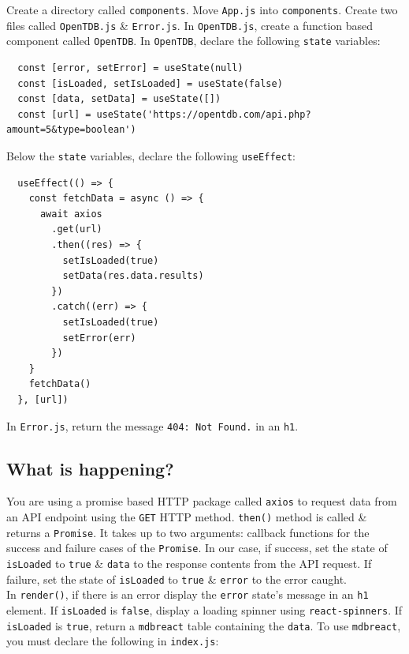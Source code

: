 \documentclass{article}
\begin{document}
Create a directory called \texttt{components}. Move \texttt{App.js} into \texttt{components}. Create two files called \texttt{OpenTDB.js} \& \texttt{Error.js}. In \texttt{OpenTDB.js}, create a function based component called \texttt{OpenTDB}. In \texttt{OpenTDB}, declare the following \texttt{state} variables:
\begin{verbatim}
  const [error, setError] = useState(null)
  const [isLoaded, setIsLoaded] = useState(false)
  const [data, setData] = useState([])
  const [url] = useState('https://opentdb.com/api.php?amount=5&type=boolean')
\end{verbatim}

Below the \texttt{state} variables, declare the following \texttt{useEffect}:
\begin{verbatim}
  useEffect(() => {
    const fetchData = async () => {
      await axios
        .get(url)
        .then((res) => {
          setIsLoaded(true)
          setData(res.data.results)
        })
        .catch((err) => {
          setIsLoaded(true)
          setError(err)
        })
    }
    fetchData()
  }, [url])
\end{verbatim}

In \texttt{Error.js}, return the message \texttt{404: Not Found.} in an \texttt{h1}.

\subsection*{What is happening?} 
You are using a promise based HTTP package called \texttt{axios} to request data from an API endpoint using the \texttt{GET} HTTP method. \texttt{then()} method is called \& returns a \texttt{Promise}. It takes up to two arguments: callback functions for the success and failure cases of the \texttt{Promise}. In our case, if success, set the state of \texttt{isLoaded} to \texttt{true} \& \texttt{data} to the response contents from the API request. If failure, set the state of \texttt{isLoaded} to \texttt{true} \& \texttt{error} to the error caught. \\

In \texttt{render()}, if there is an error display the \texttt{error} state's message in an \texttt{h1} element. If \texttt{isLoaded} is \texttt{false}, display a loading spinner using \texttt{react-spinners}. If \texttt{isLoaded} is \texttt{true}, return a \texttt{mdbreact} table containing the \texttt{data}. To use \texttt{mdbreact}, you must declare the following in \texttt{index.js}:
\end{document}
